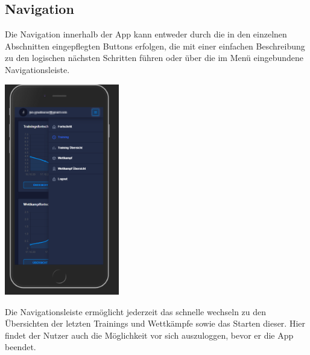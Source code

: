\documentclass[a4paper]{article}
\theoremstyle{definition}
\begin{document}
	\subsection*{Navigation}
	Die Navigation innerhalb der App kann entweder durch die in den einzelnen Abschnitten eingepflegten Buttons erfolgen, die mit einer einfachen Beschreibung zu den logischen nächsten Schritten führen oder über die im Menü eingebundene Navigationsleiste.
	\begin{center}
		\includegraphics[width= 5cm, keepaspectratio]{img/nav}
	\end{center}
	Die Navigationsleiste ermöglicht jederzeit das schnelle wechseln zu den Übersichten der letzten Trainings und Wettkämpfe sowie das Starten dieser. Hier findet der Nutzer auch die Möglichkeit vor sich auszuloggen, bevor er die App beendet.  
\end{document}
